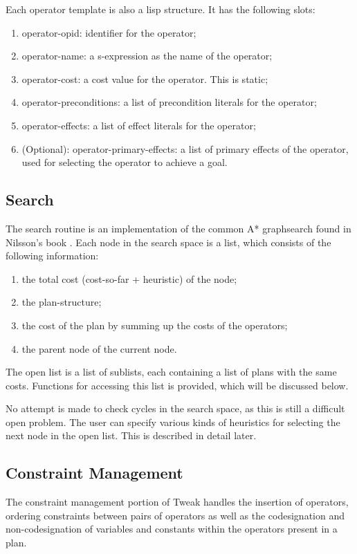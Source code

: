 Each operator template is also a lisp structure.  It has the following
slots:
\begin{enumerate}
\item operator-opid: identifier for the operator;
\item operator-name: a s-expression as the name of the operator;
\item operator-cost: a cost value for the operator.  This is static;
\item operator-preconditions: a list of precondition literals for the
operator;
\item operator-effects: a list of effect literals for the operator;
\item (Optional): operator-primary-effects: a list of primary effects
of the operator, used for selecting the operator to achieve a goal.
\end{enumerate}

\subsection{Search}
The search routine is an implementation of the common A* graphsearch
found in Nilsson's book \cite{nilsson}.  Each node in the search space
is a list, which consists of the following information:
\begin{enumerate}
\item the total cost (cost-so-far + heuristic) of the node;
\item the plan-structure;
\item the cost of the plan by summing up the costs of the operators;
\item the parent node of the current node.
\end{enumerate}

The open list is a list of sublists, each containing a list of plans
with the same costs.  Functions for accessing this list is provided,
which will be discussed below.

No attempt is made to check cycles in the search space, as this is
still a difficult open problem.  The user can specify various kinds of
heuristics for selecting the next node in the open list.  This is
described in detail later.

\subsection{Constraint Management}
The constraint management portion of Tweak handles the insertion of
operators, ordering constraints between pairs of operators as well as
the codesignation and non-codesignation of variables and constants
within the operators present in a plan.

